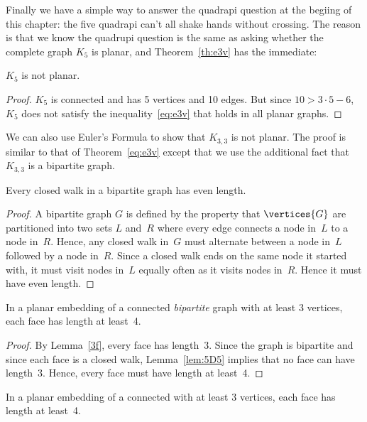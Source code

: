 Finally we have a simple way to answer the quadrapi question at the
begiing of this chapter: the five quadrapi can't all shake hands without
crossing.  The reason is that we know the quadrupi question is the same as
asking whether the complete graph $K_5$ is planar, and 
Theorem~\ref{th:e3v} has the immediate:
\begin{corollary}\label{k5not}
$K_5$ is not planar.
\end{corollary}
\begin{proof}
  $K_5$ is connected and has 5 vertices and 10 edges.  But since $10 > 3
  \cdot 5-6$, $K_5$ does not satisfy the inequality~\eqref{eq:e3v} that
  holds in all planar graphs.
\end{proof}

We can also use Euler's Formula to show that $K_{3, 3}$ is not
planar.  The proof is similar to that of Theorem~\ref{eq:e3v} except that
we use the additional fact that $K_{3, 3}$ is a bipartite graph.

\begin{editingnotes}
\begin{lemma*}\label{lem:5D5}
Every closed walk in a bipartite graph has even length.
\end{lemma*}

\begin{proof}
A bipartite graph $G$ is defined by the property that $\vertices{G}$
are partitioned into two sets $L$ and~$R$ where every edge
connects a node in~$L$ to a node in~$R$.  Hence, any closed walk
in~$G$ must alternate between a node in~$L$ followed by a node
in~$R$.  Since a closed walk ends on the same node it started with, it
must visit nodes in~$L$ equally often as it visits nodes in~$R$.
Hence it must have even length.
\end{proof}

\begin{corollary}\label{cor:5D6}
In a planar embedding of a connected \emph{bipartite} graph with at
least 3 vertices, each face has length at least~4.
\end{corollary}
\begin{proof}
  By Lemma~\ref{3f}, every face has length~3.  Since the graph is
  bipartite and since each face is a closed walk, Lemma~\ref{lem:5D5}
  implies that no face can have length~3.  Hence, every face must have
  length at least~4.
\end{proof}
\end{editingnotes}

\begin{lemma}\label{lem:5D6}
In a planar embedding of a connected  with at
least 3 vertices, each face has length at least~4.
\end{lemma}

